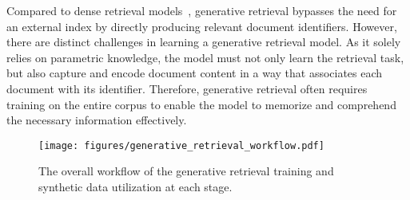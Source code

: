 Compared to dense retrieval models~\cite{karpukhin2020dense}, generative retrieval bypasses the need for an external index by directly producing relevant document identifiers. However, there are distinct challenges in learning a generative retrieval model.
As it solely relies on parametric knowledge, the model must not only learn the retrieval task, but also capture and encode document content in a way that associates each document with its identifier. Therefore, generative retrieval often requires training on the entire corpus to enable the model to memorize and comprehend the necessary information effectively. 

\begin{figure*}[htbp]
    \centering
    \texttt{[image: figures/generative\_retrieval\_workflow.pdf]}
    \caption{The overall workflow of the generative retrieval training and synthetic data utilization at each stage.}
    \label{fig:workflow}
\end{figure*}
